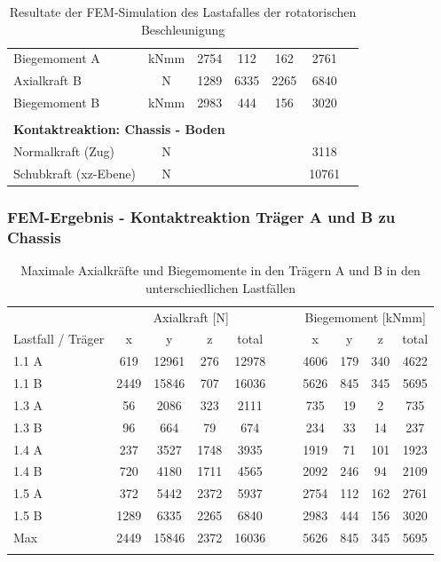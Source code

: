 \begin{table}[H]
\begin{tabular}{lcccccc}
  Biegemoment A	&	kNmm	&	2754	&	112	&	162	&	2761	&		\\
  Axialkraft B	&	N	&	1289	&	6335	&	2265	&	6840	&		\\
  Biegemoment B	&	kNmm	&	2983	&	444	&	156	&	3020	&		\\	\hline	\\
  \multicolumn{5}{l}{\textbf{Kontaktreaktion: Chassis - Boden}}									&		&		\\	\thickhline
  Normalkraft (Zug)	&	N	&		&		&		&	3118	&		\\
  Schubkraft (xz-Ebene)	&	N	&		&		&		&	10761	&		\\	\hline
  \end{tabular}
  \caption{Resultate der FEM-Simulation des Lastafalles der rotatorischen Beschleunigung}
  \label{tab:FEM 1.5}
  \end{table}


  \subsubsection{FEM-Ergebnis - Kontaktreaktion Träger A und B zu Chassis}
  \label{sec:FEMres Träger}
  \begin{table}[H]
  \centering
  \begin{tabular}{lcccccccccc}
  \thickhline
  	&	\multicolumn{4}{c}{Axialkraft [N]}							&	&	&	\multicolumn{4}{c}{Biegemoment [kNmm]}							\\
  Lastfall / Träger	&	x	&	y	&	z	&	total	&	&	&	x	&	y	&	z	&	total	\\	\hline
  1.1 A	&	619	&	12961	&	276	&	12978	&	&	&	4606	&	179	&	340	&	4622	\\
  1.1 B	&	2449	&	15846	&	707	&	16036	&	&	&	5626	&	845	&	345	&	5695	\\
  1.3 A	&	56	&	2086	&	323	&	2111	&	&	&	735	&	19	&	2	&	735	\\
  1.3 B	&	96	&	664	&	79	&	674	&	&	&	234	&	33	&	14	&	237	\\
  1.4 A	&	237	&	3527	&	1748	&	3935	&	&	&	1919	&	71	&	101	&	1923	\\
  1.4 B	&	720	&	4180	&	1711	&	4565	&	&	&	2092	&	246	&	94	&	2109	\\
  1.5 A	&	372	&	5442	&	2372	&	5937	&	&	&	2754	&	112	&	162	&	2761	\\
  1.5 B	&	1289	&	6335	&	2265	&	6840	&	&	&	2983	&	444	&	156	&	3020	\\	\hline
  Max	&	2449	&	15846	&	2372	&	16036	&	&	&	5626	&	845	&	345	&	5695	\\	\thickhline
  \end{tabular}
  \caption{Maximale Axialkräfte und Biegemomente in den Trägern A und B in den unterschiedlichen Lastfällen}
  \label{tab:FEMres Träger Kont}
  \end{table}


